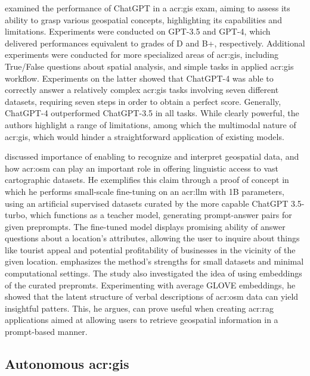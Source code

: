 \cite{mooneyUnderstandingGeospatialSkills2023} examined the performance of ChatGPT in a \acrfull{acr:gis} exam, aiming to assess its ability to grasp various geospatial concepts, highlighting its capabilities and limitations. Experiments were conducted on GPT-3.5 and GPT-4, which delivered performances equivalent to grades of D and B+, respectively. Additional experiments were conducted for more specialized areas of \acrshort{acr:gis}, including True/False questions about spatial analysis, and simple tasks in applied \acrshort{acr:gis} workflow. Experiments on the latter showed that ChatGPT-4 was able to correctly answer a relatively complex \acrshort{acr:gis} tasks involving seven different datasets, requiring seven steps in order to obtain a perfect score. Generally, ChatGPT-4 outperformed ChatGPT-3.5 in all tasks. While clearly powerful, the authors highlight a range of limitations, among which the multimodal nature of \acrshort{acr:gis}, which would hinder a straightforward application of existing models.

\cite{unluChatmapLargeLanguage2023} discussed importance of enabling  to recognize and interpret geospatial data, and how \gls{acr:osm} can play an important role in offering  linguistic access to vast cartographic datasets. He exemplifies this claim through a proof of concept in which he performs small-scale fine-tuning on an \acrshort{acr:llm} with 1B parameters, using an artificial supervised datasets curated by the more capable ChatGPT 3.5-turbo, which functions as a teacher model, generating prompt-answer pairs for given preprompts. The fine-tuned model displays promising ability of answer questions about a location's attributes, allowing the user to inquire about things like tourist appeal and potential profitability of businesses in the vicinity of the given location. \citeauthor{unluChatmapLargeLanguage2023} emphasizes the method's strengths for small datasets and minimal computational settings. The study also investigated the idea of using embeddings of the curated prepromts. Experimenting with average GLOVE embeddings, he showed that the latent structure of verbal descriptions of \gls{acr:osm} data can yield insightful patters. This, he argues, can prove useful when creating \acrfull{acr:rag} applications aimed at allowing users to retrieve geospatial information in a prompt-based manner.

\subsection[Autonomous GIS]{Autonomous \acrshort{acr:gis}}

